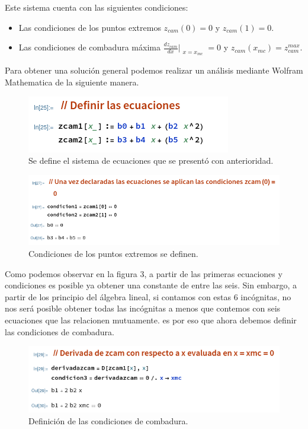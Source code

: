 \documentclass[12pt, letterpaper]{article}
\begin{document}
Este sistema cuenta con las siguientes condiciones:
\begin{itemize}
	\item Las condiciones de los puntos extremos $z_{cam}(0) = 0$ y $z_{cam}(1) = 0$.
	\item Las condiciones de combadura máxima $\frac{dz_{cam}}{dx}\Bigr|_{\substack{x=x_{mc}}} = 0$ y $z_{cam}(x_{mc}) = z_{cam}^{max}$.
\end{itemize}

Para obtener una solución general podemos realizar un análisis mediante Wolfram Mathematica de la siguiente manera.

\begin{figure}[H]
	\centering
	\includegraphics[width=\textwidth]{1.png}
	\caption{Se define el sistema de ecuaciones que se presentó con anterioridad.}
\end{figure}

\begin{figure}[H]
	\centering
	\includegraphics[width=\textwidth]{2.png}
	\caption{Condiciones de los puntos extremos se definen.}
\end{figure}
Como podemos observar en la figura 3, a partir de las primeras ecuaciones y condiciones es posible ya obtener una constante de entre las seis. Sin embargo, a partir de los principio del álgebra lineal, si contamos con estas 6 incógnitas, no nos será posible obtener todas las incógnitas a menos que contemos con seis ecuaciones que las relacionen mutuamente. es por eso que ahora debemos definir las condiciones de combadura.

\begin{figure}[H]
	\centering
	\includegraphics[width=\textwidth]{3.png}
	\caption{Definición de las condiciones de combadura.}
\end{figure}
\end{document}
